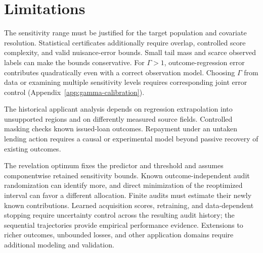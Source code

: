 \FloatBarrier
\section{Limitations}
\label{sec:limitations}
The sensitivity range must be justified for the target population and covariate resolution. Statistical certificates additionally require overlap, controlled score complexity, and valid nuisance-error bounds. Small tail mass and scarce observed labels can make the bounds conservative. For \(\Gamma>1\), outcome-regression error contributes quadratically even with a correct observation model. Choosing \(\Gamma\) from data or examining multiple sensitivity levels requires corresponding joint error control (Appendix~\ref{app:gamma-calibration}).

The historical applicant analysis depends on regression extrapolation into unsupported regions and
on differently measured source fields. Controlled masking checks known issued-loan outcomes.
Repayment under an untaken lending action requires a causal or experimental model beyond passive
recovery of existing outcomes.

The revelation optimum fixes the predictor and threshold and assumes componentwise retained
sensitivity bounds. Known outcome-independent audit randomization can identify more, and direct
minimization of the reoptimized interval can favor a different allocation. Finite audits must
estimate their newly known contributions. Learned acquisition scores, retraining, and data-dependent
stopping require uncertainty control across the resulting audit history; the sequential trajectories
provide empirical performance evidence. Extensions to richer outcomes, unbounded losses, and other
application domains require additional modeling and validation.
